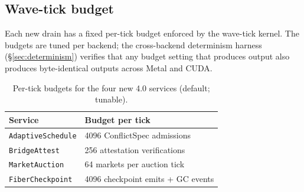 \subsection{Wave-tick budget}

Each new drain has a fixed per-tick budget enforced by the wave-tick
kernel. The budgets are tuned per backend; the cross-backend
determinism harness (\S\ref{sec:determinism}) verifies that any
budget setting that produces output also produces byte-identical
outputs across Metal and CUDA.

\begin{table}[ht]
\centering
\small
\caption{Per-tick budgets for the four new 4.0 services
(default; tunable).}
\label{tab:abmf-budgets}
\begin{tabular}{ll}
\toprule
\textbf{Service} & \textbf{Budget per tick} \\
\midrule
\texttt{AdaptiveSchedule} & 4096 ConflictSpec admissions \\
\texttt{BridgeAttest}     &  256 attestation verifications \\
\texttt{MarketAuction}    &   64 markets per auction tick \\
\texttt{FiberCheckpoint}  & 4096 checkpoint emits + GC events \\
\bottomrule
\end{tabular}
\end{table}

